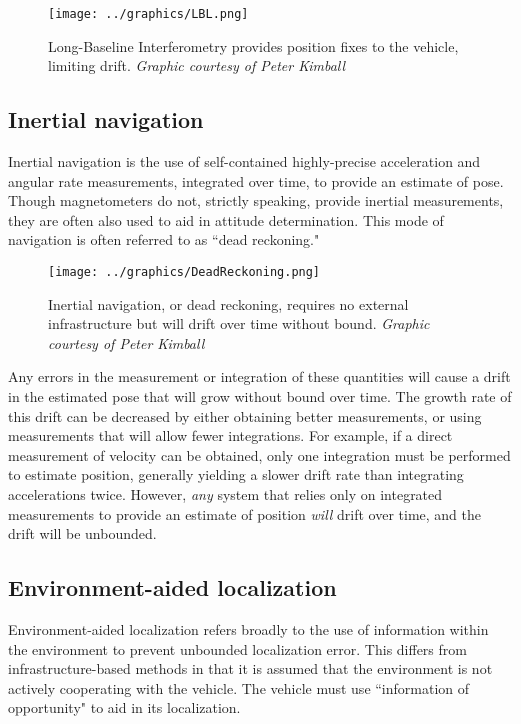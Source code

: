 \begin{figure}[!htb]
   \centering
   \texttt{[image: ../graphics/LBL.png]} %
   \caption{Long-Baseline Interferometry provides position fixes to the vehicle, limiting drift. \emph{Graphic courtesy of Peter Kimball}}
   \label{fig:LBL}
\end{figure}

\subsection{Inertial navigation}

Inertial navigation is the use of self-contained highly-precise acceleration and angular rate measurements, integrated over time, to provide an estimate of pose. Though magnetometers do not, strictly speaking, provide inertial measurements, they are often also used to aid in attitude determination. This mode of navigation is often referred to as ``dead reckoning."

\begin{figure}[!htb]
   \centering
   \texttt{[image: ../graphics/DeadReckoning.png]} %
   \caption{Inertial navigation, or dead reckoning, requires no external infrastructure but will drift over time without bound. \emph{Graphic courtesy of Peter Kimball}}
   \label{fig:inertialNav}
\end{figure}

Any errors in the measurement or integration of these quantities will cause a drift in the estimated pose that will grow without bound over time. The growth rate of this drift can be decreased by either obtaining better measurements, or using measurements that will allow fewer integrations. For example, if a direct measurement of velocity can be obtained, only one integration must be performed to estimate position, generally yielding a slower drift rate than integrating accelerations twice. However, \emph{any} system that relies only on integrated measurements to provide an estimate of position \emph{will} drift over time, and the drift will be unbounded. 

\subsection{Environment-aided localization}

Environment-aided localization refers broadly to the use of information within the environment to prevent unbounded localization error. This differs from infrastructure-based methods in that it is assumed that the environment is not actively cooperating with the vehicle. The vehicle must use ``information of opportunity" to aid in its localization. 

